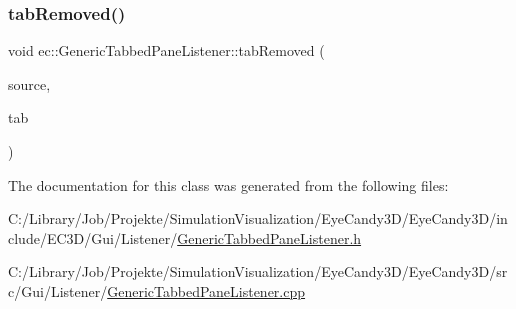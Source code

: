 \subsubsection{\texorpdfstring{tab\+Removed()}{tabRemoved()}}
{\footnotesize\ttfamily void ec\+::\+Generic\+Tabbed\+Pane\+Listener\+::tab\+Removed (\begin{DoxyParamCaption}\item[{agui\+::\+Tabbed\+Pane $\ast$}]{source,  }\item[{agui\+::\+Tab $\ast$}]{tab }\end{DoxyParamCaption})\hspace{0.3cm}{\ttfamily [override]}}



The documentation for this class was generated from the following files\+:\begin{DoxyCompactItemize}
\item 
C\+:/\+Library/\+Job/\+Projekte/\+Simulation\+Visualization/\+Eye\+Candy3\+D/\+Eye\+Candy3\+D/include/\+E\+C3\+D/\+Gui/\+Listener/\mbox{\hyperlink{_generic_tabbed_pane_listener_8h}{Generic\+Tabbed\+Pane\+Listener.\+h}}\item 
C\+:/\+Library/\+Job/\+Projekte/\+Simulation\+Visualization/\+Eye\+Candy3\+D/\+Eye\+Candy3\+D/src/\+Gui/\+Listener/\mbox{\hyperlink{_generic_tabbed_pane_listener_8cpp}{Generic\+Tabbed\+Pane\+Listener.\+cpp}}\end{DoxyCompactItemize}
